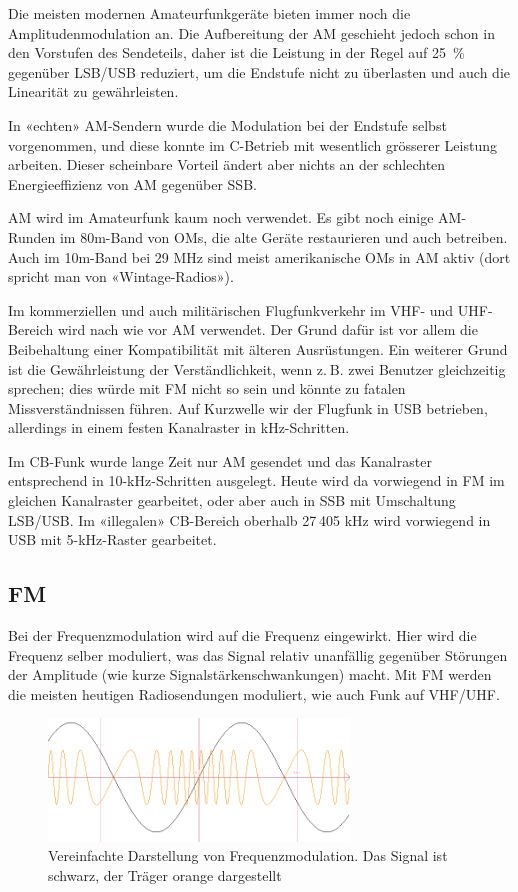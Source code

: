 Die meisten modernen Amateurfunkgeräte bieten immer noch die Amplitudenmodulation an. Die Aufbereitung der AM geschieht jedoch schon in den Vorstufen des Sendeteils, daher ist die Leistung in der Regel auf 25 \% gegenüber LSB/USB reduziert, um die Endstufe nicht zu überlasten und auch die Linearität zu gewährleisten.

In «echten» AM-Sendern wurde die Modulation bei der Endstufe selbst vorgenommen, und diese konnte im C-Betrieb mit wesentlich grösserer Leistung arbeiten. Dieser scheinbare Vorteil ändert aber nichts an der schlechten Energieeffizienz von AM gegenüber SSB.

AM wird im Amateurfunk kaum noch verwendet. Es gibt noch einige AM-Runden im 80m-Band von OMs, die alte Geräte restaurieren und auch betreiben. Auch im 10m-Band bei 29 MHz sind meist amerikanische OMs in AM aktiv (dort spricht man von «Wintage-Radios»).

Im kommerziellen und auch militärischen Flugfunkverkehr im VHF- und UHF-Bereich wird nach wie vor AM verwendet. Der Grund dafür ist vor allem die Beibehaltung einer Kompatibilität mit älteren Ausrüstungen. Ein weiterer Grund ist die Gewährleistung der Verständlichkeit, wenn z. B. zwei Benutzer gleichzeitig sprechen; dies würde mit FM nicht so sein und könnte zu fatalen Missverständnissen führen. Auf Kurzwelle wir der Flugfunk in USB betrieben, allerdings in einem festen Kanalraster in kHz-Schritten.

Im CB-Funk wurde lange Zeit nur AM gesendet und das Kanalraster entsprechend in 10-kHz-Schritten ausgelegt. Heute wird da vorwiegend in FM im gleichen Kanalraster gearbeitet, oder aber auch in SSB mit Umschaltung LSB/USB. Im «illegalen» CB-Bereich oberhalb 27 405 kHz wird vorwiegend in USB mit 5-kHz-Raster gearbeitet.

\subsection{FM}\label{sec:fm}
Bei der Frequenzmodulation wird auf die Frequenz eingewirkt. Hier wird die Frequenz selber moduliert, was das Signal relativ unanfällig gegenüber Störungen der Amplitude (wie kurze Signalstärkenschwankungen) macht. Mit FM werden die meisten heutigen Radiosendungen moduliert, wie auch Funk auf VHF/UHF.

\begin{figure}[h!]
 \centering
 \includegraphics[width=8cm]{./png/Graph_FM.png}
 \caption{Vereinfachte Darstellung von Frequenzmodulation. Das Signal ist schwarz, der Träger orange dargestellt}
 \label{fig:fm}
\end{figure}

